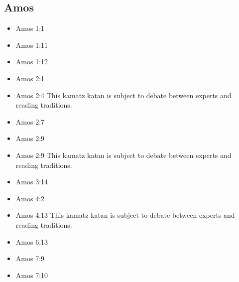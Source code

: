 \documentclass[14pt]{book}
\begin{document}
															\subsection{Amos}
														\begin{multicols}{2}\begin{itemize}
																
																\item Amos 1:1
																
																\item Amos 1:11
																
																\item Amos 1:12
																
																\item Amos 2:1
																
																\item Amos 2:4 This kamatz katan is subject to debate between experts and reading traditions.
																
																\item Amos 2:7
																
																\item Amos 2:9
																
																\item Amos 2:9 This kamatz katan is subject to debate between experts and reading traditions.
																
																\item Amos 3:14
																
																\item Amos 4:2
																
																\item Amos 4:13 This kamatz katan is subject to debate between experts and reading traditions.
																
																\item Amos 6:13
																
																\item Amos 7:9
																
																\item Amos 7:10
																

\end{itemize}
\end{multicols}
\end{document}
